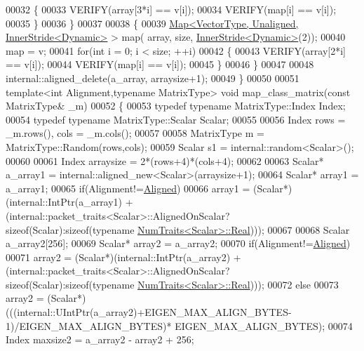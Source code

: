 \begin{DoxyCode}
00032     \{
00033       VERIFY(array[3*i] == v[i]);
00034       VERIFY(map[i] == v[i]);
00035     \}
00036   \}
00037 
00038   \{
00039     \hyperlink{group___core___module_class_eigen_1_1_map}{Map<VectorType, Unaligned, InnerStride<Dynamic>} > map(
      array, size, \hyperlink{class_eigen_1_1_inner_stride}{InnerStride<Dynamic>}(2));
00040     map = v;
00041     \textcolor{keywordflow}{for}(\textcolor{keywordtype}{int} i = 0; i < size; ++i)
00042     \{
00043       VERIFY(array[2*i] == v[i]);
00044       VERIFY(map[i] == v[i]);
00045     \}
00046   \}
00047 
00048   internal::aligned\_delete(a\_array, arraysize+1);
00049 \}
00050 
00051 \textcolor{keyword}{template}<\textcolor{keywordtype}{int} Alignment,\textcolor{keyword}{typename} MatrixType> \textcolor{keywordtype}{void} map\_class\_matrix(\textcolor{keyword}{const} MatrixType& \_m)
00052 \{
00053   \textcolor{keyword}{typedef} \textcolor{keyword}{typename} MatrixType::Index Index;
00054   \textcolor{keyword}{typedef} \textcolor{keyword}{typename} MatrixType::Scalar Scalar;
00055 
00056   Index rows = \_m.rows(), cols = \_m.cols();
00057 
00058   MatrixType m = MatrixType::Random(rows,cols);
00059   Scalar s1 = internal::random<Scalar>();
00060 
00061   Index arraysize = 2*(rows+4)*(cols+4);
00062 
00063   Scalar* a\_array1 = internal::aligned\_new<Scalar>(arraysize+1);
00064   Scalar* array1 = a\_array1;
00065   \textcolor{keywordflow}{if}(Alignment!=\hyperlink{group__enums_gga45fe06e29902b7a2773de05ba27b47a1ad37d4c71425bb286e9b4103830538fbf}{Aligned})
00066     array1 = (Scalar*)(internal::IntPtr(a\_array1) + (internal::packet\_traits<Scalar>::AlignedOnScalar?\textcolor{keyword}{
      sizeof}(Scalar):\textcolor{keyword}{sizeof}(\textcolor{keyword}{typename} \hyperlink{group___core___module_struct_eigen_1_1_num_traits}{NumTraits<Scalar>::Real})));
00067 
00068   Scalar a\_array2[256];
00069   Scalar* array2 = a\_array2;
00070   \textcolor{keywordflow}{if}(Alignment!=\hyperlink{group__enums_gga45fe06e29902b7a2773de05ba27b47a1ad37d4c71425bb286e9b4103830538fbf}{Aligned})
00071     array2 = (Scalar*)(internal::IntPtr(a\_array2) + (internal::packet\_traits<Scalar>::AlignedOnScalar?\textcolor{keyword}{
      sizeof}(Scalar):\textcolor{keyword}{sizeof}(\textcolor{keyword}{typename} \hyperlink{group___core___module_struct_eigen_1_1_num_traits}{NumTraits<Scalar>::Real})));
00072   \textcolor{keywordflow}{else}
00073     array2 = (Scalar*)(((internal::UIntPtr(a\_array2)+EIGEN\_MAX\_ALIGN\_BYTES-1)/EIGEN\_MAX\_ALIGN\_BYTES)*
      EIGEN\_MAX\_ALIGN\_BYTES);
00074   Index maxsize2 = a\_array2 - array2 + 256;

\end{DoxyCode}
